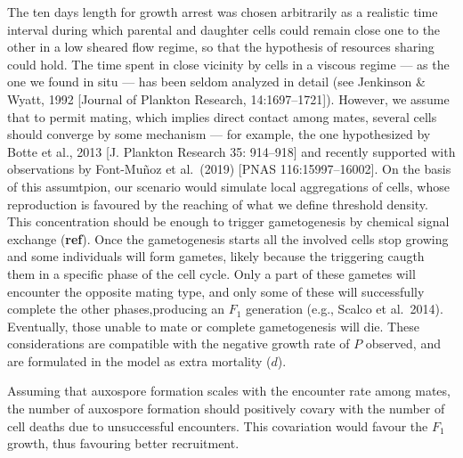\documentclass[a4paper,oneside]{article}
\begin{document}
    The ten days length for growth arrest was chosen arbitrarily as a realistic time interval during which parental and daughter cells could remain close one to the other in a low sheared flow regime, so that the hypothesis of resources sharing could hold.
    The time spent in close vicinity by cells in a viscous regime  --- as the one we found in situ --- has been seldom analyzed in detail (see Jenkinson \& Wyatt, 1992 [Journal of Plankton Research, 14:1697--1721]).
    However, we assume that to permit mating, which implies direct contact among mates, several cells should converge by some mechanism --- for example, the one hypothesized by Botte et al., 2013 [J. Plankton Research 35: 914--918] and recently supported with observations by Font-Mu{\~n}oz et al.~(2019) [PNAS 116:15997--16002].
    On the basis of this assumtpion, our scenario would simulate local aggregations of cells, whose reproduction is favoured by the reaching of what we define threshold density.
    This concentration should be enough to trigger gametogenesis by chemical signal exchange ({\color{green}\textbf{ref}}).
    Once the gametogenesis starts all the involved cells stop growing and some individuals will form gametes, likely because the triggering caugth them in a specific phase of the cell cycle.
    Only a part of these gametes will encounter the opposite mating type, and only some of these will successfully complete the other phases,producing an $F_{1}$ generation (e.g., Scalco et al.~2014).
    Eventually, those unable to mate or complete gametogenesis will die.
    These considerations are compatible with the negative growth rate of $P$ observed, and are formulated in the model as extra mortality ($d$).

    Assuming that auxospore formation scales with the encounter rate among mates, the number of auxospore formation should positively covary with the number of cell deaths due to unsuccessful encounters.
    This covariation would favour the $F_{1}$ growth, thus favouring better recruitment.
\end{document}
